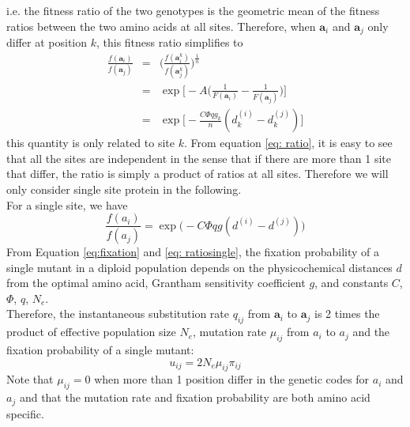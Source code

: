 \documentclass[13pt]{article}
\begin{document}
i.e. the fitness ratio of the two genotypes is the geometric mean of the fitness ratios between the two amino acids at all sites.
Therefore, when $\mathbf{a}_i$ and $\mathbf{a}_j$ only differ at position $k$, this fitness ratio simplifies to  
\begin{eqnarray}
\frac{f(\mathbf{a}_i)}{f(\mathbf{a}_j)} & = & \Big( \frac{f(\mathbf{a}_i^k)}{f(\mathbf{a}_j^k)}\Big)^{\frac{1}{n}}\\
 & = &\exp \Big[-A\Big( \frac{1}{F(\mathbf{a}_i )} - \frac{1}{F(\mathbf{a}_j )}\Big)\Big] \nonumber\\
& = & \exp\Big[ -\frac{C\Phi q g_k}{n}(d_k^{(i)} - d_k^{(j)})\Big] \label{eq: ratio}
\end{eqnarray}
\noindent
this quantity is only related to site $k$.
From equation \ref{eq: ratio}, it is easy to see that all the sites are independent in the sense that if there are more than 1 site that differ, the ratio is simply a product of ratios at all sites.
Therefore we will only consider single site protein in the following.\\

For a single site, we have 
\begin{equation}
\frac{f(a_i)}{f(a_j)} = \exp\Big(-C\Phi q g(d^{(i)}-d^{(j)})\Big)
\label{eq: ratiosingle}
\end{equation}
From Equation \ref{eq:fixation} and \ref{eq: ratiosingle}, the fixation probability of a single mutant in a diploid population depends on the physicochemical distances $d$ from the optimal amino acid, Grantham sensitivity coefficient $g$, and constants $C$, $\Phi$, $q$, $N_e$.\\


Therefore, the instantaneous substitution rate $q_{ij}$ from $\mathbf{a}_i$ to $\mathbf{a}_j$ is 2 times the product of effective population size $N_e$, mutation rate $\mu_{ij}$ from $a_i$ to $a_j$ and the fixation probability of a single mutant:
\begin{equation}
u_{ij} = 2N_e \mu_{ij} \pi_{ij}
\label{eq:subrate}
\end{equation}
Note that $\mu_{ij} = 0$ when more than 1 position differ in the genetic codes for $a_i$ and $a_j$ and that the mutation rate and fixation probability are both amino acid specific. \\
\end{document}
